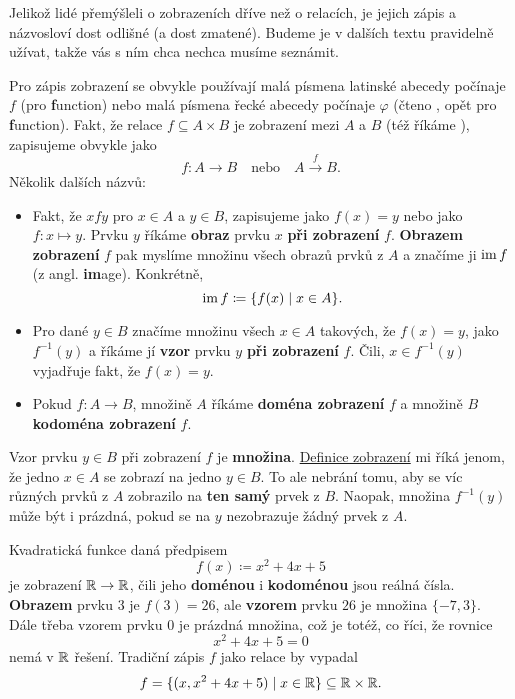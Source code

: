 Jelikož lidé přemýšleli o zobrazeních dříve než o relacích, je jejich zápis a
názvosloví dost odlišné (a dost zmatené). Budeme je v dalších textu pravidelně
užívat, takže vás s ním chca nechca musíme seznámit.

Pro zápis zobrazení se obvykle používají malá písmena latinské abecedy počínaje
$f$ (pro \textbf{f}unction) nebo malá písmena řecké abecedy počínaje $\varphi$
(čteno , opět pro \textbf{f}unction). Fakt, že relace $f \subseteq A
\times B$ je zobrazení mezi $A$ a $B$ (též říkáme ), zapisujeme
obvykle jako
\[
 f:A \to B \quad \text{nebo} \quad A \overset{f}{ \to } B.
\]
Několik dalších názvů:
\begin{itemize}
 \item Fakt, že $xfy$ pro $x \in A$ a $y \in B$, zapisujeme jako $f(x) = y$ nebo
  jako $f:x \mapsto y$. Prvku $y$ říkáme \textbf{obraz} prvku $x$ \textbf{při
  zobrazení} $f$. \textbf{Obrazem zobrazení} $f$ pak myslíme množinu všech
  obrazů prvků z $A$ a značíme ji $\operatorname{im} f$ (z angl. \textbf{im}age). Konkrétně,
  \[
   \operatorname{im} f \coloneqq \{f(x) \mid x \in A\}.
  \]
 \item Pro dané $y \in B$ značíme množinu všech $x \in A$ takových, že $f(x) =
  y$, jako $f^{-1}(y)$ a říkáme jí \textbf{vzor} prvku $y$ \textbf{při
  zobrazení} $f$. Čili, $x \in f^{-1}(y)$ vyjadřuje fakt, že $f(x) = y$.
 \item Pokud $f:A \to B$, množině $A$ říkáme \textbf{doména zobrazení} $f$ a
  množině $B$ \textbf{kodoména zobrazení} $f$.
\end{itemize}

\begin{warning}
 Vzor prvku $y \in B$ při zobrazení $f$ je \textbf{množina}.
 \hyperref[def:zobrazeni]{Definice zobrazení} mi říká jenom, že jedno $x \in A$
 se zobrazí na jedno $y \in B$. To ale nebrání tomu, aby se víc různých prvků z
 $A$ zobrazilo na \textbf{ten samý} prvek z $B$. Naopak, množina $f^{-1}(y)$ 
 může být i prázdná, pokud se na $y$ nezobrazuje žádný prvek z $A$.
\end{warning}

\begin{example}
 Kvadratická funkce daná předpisem
 \[
  f(x) \coloneqq x^2 + 4x + 5
 \]
 je zobrazení $\mathbb{R} \to \mathbb{R}$, čili jeho \textbf{doménou} i \textbf{kodoménou} jsou
 reálná čísla. \textbf{Obrazem} prvku $3$ je $f(3) = 26$, ale \textbf{vzorem}
 prvku $26$ je množina $\{-7,3\}$. Dále třeba vzorem prvku $0$ je prázdná
 množina, což je totéž, co říci, že rovnice
 \[
  x^2 + 4x + 5 = 0
 \]
 nemá v $\mathbb{R}$ řešení. Tradiční zápis $f$ jako relace by vypadal
 \[
  f = \{(x, x^2 + 4x + 5) \mid x \in \mathbb{R}\}  \subseteq \mathbb{R} \times \mathbb{R}.
 \]
\end{example}

